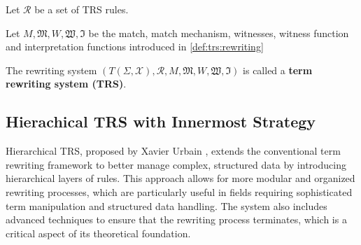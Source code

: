   \begin{definition}
    Let $\mathcal{R}$ be a set of TRS rules. 

    Let $M, \mathfrak{M}, W , \mathfrak{W}, \mathfrak{I}$ be the match, match mechanism, witnesses, witness function and interpretation functions introduced in \autoref{def:trs:rewriting}
 
    The rewriting system $(T(\Sigma,\mathcal{X}), \mathcal{R}, M, \mathfrak{M}, W, \mathfrak{W}, \mathfrak{I})$ is called a \textbf{term rewriting system (TRS)}.
  \end{definition}



  \subsection{Hierachical TRS with Innermost Strategy}
  Hierarchical TRS, proposed by Xavier Urbain \cite{urbain2001approche}, extends the conventional term rewriting framework to better manage complex, structured data by introducing hierarchical layers of rules. This approach allows for more modular and organized rewriting processes, which are particularly useful in fields requiring sophisticated term manipulation and structured data handling. The system also includes advanced techniques to ensure that the rewriting process terminates, which is a critical aspect of its theoretical foundation.
  
